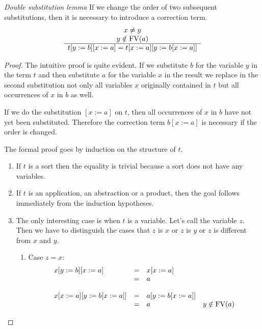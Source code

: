 \begin{lemma}
    \label{DoubleSubstitution}
    \emph{Double substitution lemma} If we change the order of two subsequent
    substitutions, then it is necessary to introduce a correction term.
    $$
    \begin{array}{c} 
        x \ne y
        \\
        y \notin \text{FV}(a)
     \\ \hline 
        t[y:=b][x:=a]
        =
        t[x:=a][y:=b[x:=a]]
    \end{array}
    $$
    \begin{proof}
        The intuitive proof is quite evident. If we substitute $b$ for the
        variable $y$ in the term $t$ and then substitute $a$ for the variable
        $x$ in the result we replace in the second substitution not only all
        variables $x$ originally contained in $t$ but all occurrences of $x$ in
        $b$ as well.

        If we do the substitution $[x:=a]$ on $t$, then all occurrences of $x$
        in $b$ have not yet been substituted. Therefore the correction term
        $b[x:=a]$ is necessary if the order is changed.

        The formal proof goes by induction on the structure of $t$.

        \begin{enumerate}

            \item If $t$ is a sort then the equality is trivial because a sort
                does not have any variables.

            \item If $t$ is an application, an abstraction or a product, then
                the goal follows immediately from the induction hypotheses.

            \item The only interesting case is when $t$ is a variable. Let's
                call the variable $z$. Then we have to distinguish the cases
                that $z$ is $x$ or $z$ is $y$ or $z$ is different from $x$ and
                $y$.

                \begin{enumerate}
                    \item Case $z = x$:
                        $$
                        \begin{array}{llll}
                            x[y:=b][x:=a]
                            &=& x[x:=a]
                            \\
                            &=& a
                            \\
                            \\
                            x[x:=a][y:=b[x:=a]]
                            &=& a[y:=b[x:=a]]
                            \\
                            &=& a & y \notin \text{FV}(a)
                        \end{array}
                        $$


\end{enumerate}
\end{enumerate}
\end{proof}
\end{lemma}
